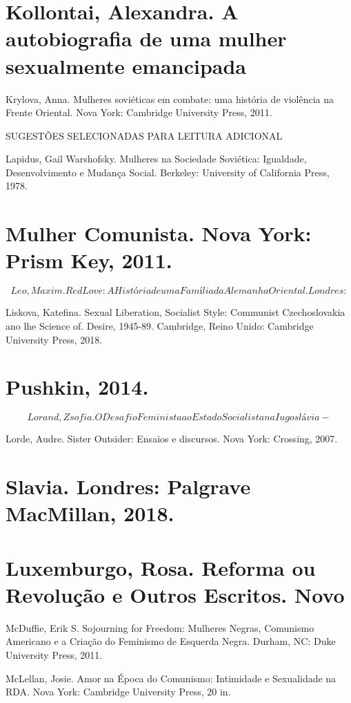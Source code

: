 \section{Kollontai, Alexandra. A autobiografia de uma mulher sexualmente emancipada}
 \par 
Krylova, Anna. Mulheres soviéticas em combate: uma história de violência na Frente Oriental. Nova York: Cambridge University Press, 2011.
 \par 
SUGESTÕES SELECIONADAS PARA LEITURA ADICIONAL
 \par 
Lapidus, Gail Warshofsky. Mulheres na Sociedade Soviética: Igualdade, Desenvolvimento e Mudança Social. Berkeley: University of California Press, 1978.
 \par 
\section{Mulher Comunista. Nova York: Prism Key, 2011.}
 \par 
\[Leo, Maxim. Red Love: A História de uma Família da Alemanha Oriental. Londres:\]
 \par 
Liskova, Katefina. Sexual Liberation, Socialist Style: Communist Czechoslovakia ano lhe Science of. Desire, 1945-89. Cambridge, Reino Unido: Cambridge University Press, 2018.
 \par 
\section{Pushkin, 2014.}
 \par 
\[Lorand, Zsofia. O Desafio Feminista ao Estado Socialista na Iugoslávia-\]
 \par 
Lorde, Audre. Sister Outsider: Ensaios e discursos. Nova York: Crossing, 2007.
 \par 
\section{Slavia. Londres: Palgrave MacMillan, 2018.}
 \par 
\section{Luxemburgo, Rosa. Reforma ou Revolução e Outros Escritos. Novo}
 \par 
McDuffie, Erik S. Sojourning for Freedom: Mulheres Negras, Comunismo Americano e a Criação do Feminismo de Esquerda Negra. Durham, NC: Duke University Press, 2011.
 \par 
McLellan, Josie. Amor na Época do Comunismo: Intimidade e Sexualidade na RDA. Nova York: Cambridge University Press, {\color{blue}20} in.
 \par 
